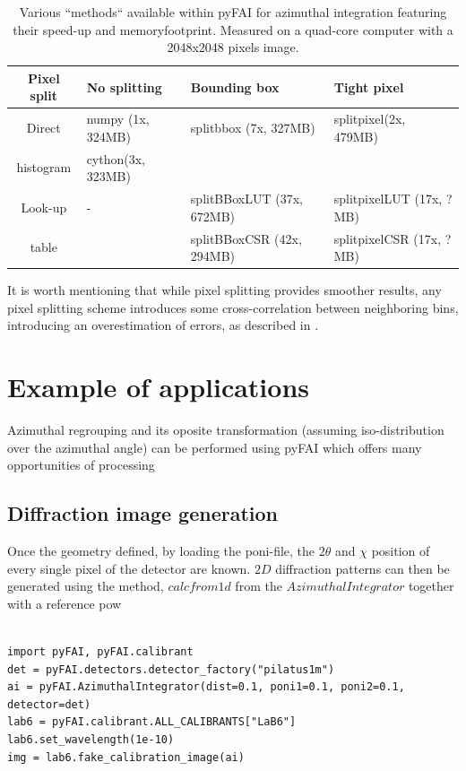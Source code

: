 \documentclass[preprint]{iucr}
\begin{document}
\begin{table}
\caption{Various ``methods`` available within pyFAI for azimuthal integration
featuring their speed-up and memoryfootprint. Measured on a quad-core
computer with a 2048x2048 pixels image.}
\begin{tabular}[pos]{|c|l|l|l|}
\hline
Pixel split& No splitting & Bounding box & Tight pixel \\
\hline
Direct    & numpy (1x, 324MB) & splitbbox (7x, 327MB) & splitpixel(2x, 479MB)\\
histogram & cython(3x, 323MB) &                       &                \\
\hline
Look-up   & -      & splitBBoxLUT (37x, 672MB)&splitpixelLUT (17x, ?MB)\\
table     &        & splitBBoxCSR (42x, 294MB)&splitpixelCSR (17x, ?MB)\\
\hline
\end{tabular}
\label{table:methods}
\end{table}

It is worth mentioning that while pixel splitting provides smoother results, any
pixel splitting scheme introduces some cross-correlation between neighboring
bins, introducing an overestimation of errors, as described in \cite{billinge2014}.

\section{Example of applications}

Azimuthal regrouping and its oposite transformation (assuming
iso-distribution over the azimuthal angle) can be performed
using pyFAI which offers many opportunities of processing

\subsection{Diffraction image generation}


Once the geometry defined, by loading the poni-file, the $2\theta$ and $\chi$
position of every single pixel of the detector are known.
$2D$ diffraction patterns can then be generated using the method, $calcfrom1d$
from the $Azimuthal Integrator$ together with a reference pow

\begin{verbatim}

import pyFAI, pyFAI.calibrant
det = pyFAI.detectors.detector_factory("pilatus1m")
ai = pyFAI.AzimuthalIntegrator(dist=0.1, poni1=0.1, poni2=0.1, detector=det)
lab6 = pyFAI.calibrant.ALL_CALIBRANTS["LaB6"]
lab6.set_wavelength(1e-10)
img = lab6.fake_calibration_image(ai)
\end{verbatim}
\end{document}
